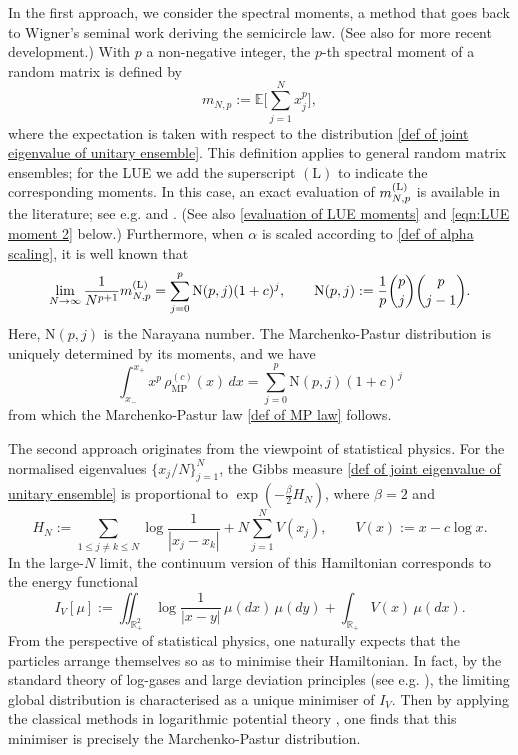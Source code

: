 \documentclass{amsart}
\def\R{\mathbb{R}}
\theoremstyle{plain}
\theoremstyle{remark}
\numberwithin{equation}{section}
\begin{document}
  
In the first approach, we consider the spectral moments, a method that goes back to Wigner’s seminal work \cite{Wi55} deriving the semicircle law. (See also \cite{CMOS19,MS13,GGR21,WF14,CDO21,ABGS21a,CCO20,FR21} for more recent development.) With $p$ a non-negative integer, the $p$-th spectral moment of a random matrix is defined by
\begin{equation} \label{def of spectral moments mNp}
    m_{N,p}:= \mathbb{E}\Big[\sum_{j=1}^{N}x_{j}^{p}\Big], 
\end{equation}
where the expectation is taken with respect to the distribution \eqref{def of joint eigenvalue of unitary ensemble}. This definition applies to general random matrix ensembles; for the LUE we add the superscript $(\mathrm L)$ to indicate the corresponding moments. 
In this case, an exact evaluation of $ m_{N,p}^{ \rm (L) } $ is available in the literature; see e.g. \cite[Theorem 2.5]{HSS92} and \cite[Proposition 9.1]{HT03}. (See also \eqref{evaluation of LUE moments} and \eqref{eqn:LUE moment 2} below.) Furthermore, when $\alpha$ is scaled according to \eqref{def of alpha scaling}, it is well known that  
\begin{equation} \label{leading order conv for LUE moment}
    \lim_{ N \to \infty }\frac{1}{N^{p+1}} m_{N,p}^{ \rm (L) } =  \sum_{j=0}^{p}\mathrm{N}(p,j)(1+c)^{j}, \qquad \mathrm{N}(p,j):=\frac{1}{p}\binom{p}{j}\binom{p}{j-1}. 
\end{equation}
Here, $\mathrm{N}(p,j)$ is the Narayana number.
The Marchenko-Pastur distribution is uniquely determined by its moments, 
and we have 
\begin{equation}
    \int_{x_-}^{x_+} x^p\,  \rho _{\mathrm {MP}}^{(c)}(x)\,dx =  \sum_{j=0}^{p}\mathrm{N}(p,j)(1+c)^{j}
\end{equation}
from which the Marchenko-Pastur law \eqref{def of MP law} follows. 


The second approach originates from the viewpoint of statistical physics.  
For the normalised eigenvalues $\{x_j/N\}_{j=1}^N$, the Gibbs measure \eqref{def of joint eigenvalue of unitary ensemble} is proportional to $\exp(-\frac{\beta}{2}H_N)$, where $\beta=2$ and 
\begin{equation}
H_N := \sum_{ 1\le j \not = k \le N } \log \frac{1}{|x_j-x_k|} +N \sum_{j=1}^N V(x_j),  \qquad  V(x):= x - c \log x. 
\end{equation}
In the large-$N$ limit, the continuum version of this Hamiltonian corresponds to the energy functional
\begin{equation} \label{def of I_V LUE}
I_V[\mu]:= \iint_{ \R_+^2 } \log \frac{1}{|x-y|}\,\mu(dx)\,\mu(dy) + \int_{ \R_+ } V(x) \,\mu(dx). 
\end{equation}
From the perspective of statistical physics, one naturally expects that the particles arrange themselves so as to minimise their Hamiltonian. In fact, by the standard theory of log-gases and large deviation principles (see e.g. \cite{Jo98,Fo10,Se24,BG97,BF25b}), the limiting global distribution is characterised as a unique minimiser of $I_V$. Then by applying the classical methods in logarithmic potential theory \cite{ST97}, one finds that this minimiser is precisely the Marchenko-Pastur distribution.
\end{document}

